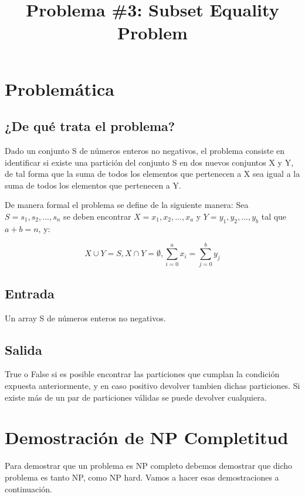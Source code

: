 \documentclass[11pt]{article}
\title{Problema \#3: Subset Equality Problem}
\begin{document}
    \maketitle
    \newpage

    \tableofcontents
    \newpage

    \section{Problemática}
    \subsection{¿De qué trata el problema?}
    Dado un conjunto S de números enteros no negativos, el problema consiste en identificar si existe una
    partición del conjunto S en dos nuevos conjuntos X y Y, de tal forma que la suma de todos los elementos
    que pertenecen a X sea igual a la suma de todos los elementos que pertenecen a Y.

    De manera formal el problema se define de la siguiente manera: Sea $S = {s_1, s_2, ... ,s_n}$ se deben
    encontrar $X = x_1, x_2, ... , x_a$ y $Y = y_1, y_2, ... ,y_b$ tal que $a+b=n$, y:

    \[
    X \cup Y = S, X \cap Y= \emptyset, \sum_{i=0}^{a} x_i = \sum_{j=0}^b y_j
    \]
    
    \subsection{Entrada}
    Un array S de números enteros no negativos.
    
    \subsection{Salida}
    True o False si es posible encontrar las particiones que cumplan la condición expuesta anteriormente, y en
    caso positivo devolver tambien dichas particiones. Si existe más de un par de particiones válidas se puede 
    devolver cualquiera.

    \section{Demostración de NP Completitud}
    Para demostrar que un problema es NP completo debemos demostrar que dicho problema es tanto NP, como NP hard.
    Vamos a hacer esas demostraciones a continuación.
\end{document}
